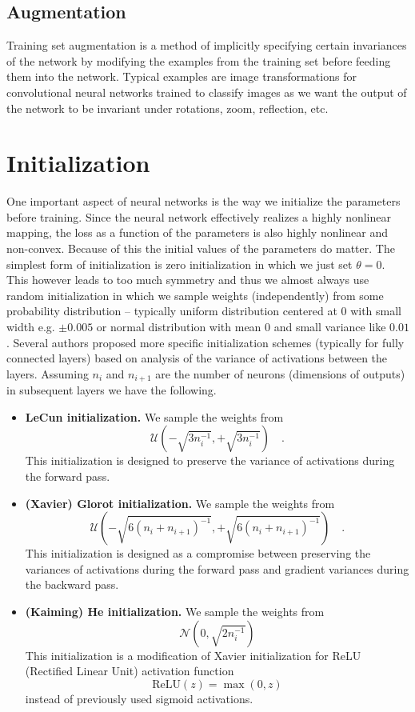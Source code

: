 \documentclass[a5paper]{article}
\newcommand{\mc}[1]{\mathcal{#1}}
\begin{document}
\subsection{Augmentation}

Training set augmentation is a method of implicitly specifying certain invariances of the network by
modifying the examples from the training set before feeding them into the network. Typical examples
are image transformations for convolutional neural networks trained to classify images as we want
the output of the network to be invariant under rotations, zoom, reflection, etc.


\section{Initialization}

One important aspect of neural networks is the way we initialize the parameters before training.
Since the neural network effectively realizes a highly nonlinear mapping, the loss as a function of
the parameters is also highly nonlinear and non-convex. Because of this the initial values of the
parameters do matter. The simplest form of initialization is zero initialization in which we just
set \(\theta = 0\). This however leads to too much symmetry and thus we almost always use random
initialization in which we sample weights (independently) from some probability distribution --
typically uniform distribution centered at 0 with small width e.g. \(\pm0.005\) or normal
distribution with mean 0 and small variance like \(0.01\). Several authors proposed more specific
initialization schemes (typically for fully connected layers) based on analysis of the variance of
activations between the layers. Assuming \(n_i\) and \(n_{i+1}\) are the number of neurons
(dimensions of outputs) in subsequent layers we have the following.

\begin{itemize}
   \item \textbf{LeCun initialization.} We sample the weights from
   \[
      \mc{U}\left(-\sqrt{3n_{i}^{-1}}, +\sqrt{3n_{i}^{-1}}\right) \quad.
   \]
   This initialization is designed to preserve the variance of activations during the forward pass.
   
   \item \textbf{(Xavier) Glorot initialization.} We sample the weights from
   \[
      \mc{U}\left(-\sqrt{6(n_{i} + n_{i+1})^{-1}}, +\sqrt{6(n_{i} + n_{i+1})^{-1}}\right) \quad.
   \]
   This initialization is designed as a compromise between preserving the variances of activations
   during the forward pass and gradient variances during the backward pass.
   
   \item \textbf{(Kaiming) He initialization.} We sample the weights from 
   \[
      \mc{N}\left(0, \sqrt{2 n_{i}^{-1}}\right)
   \]
   This initialization is a modification of Xavier initialization for ReLU (Rectified Linear Unit)
   activation function
   \[
      \text{ReLU}(z) = \max(0, z)
   \]
   instead of previously used sigmoid activations.
\end{itemize}
\end{document}
